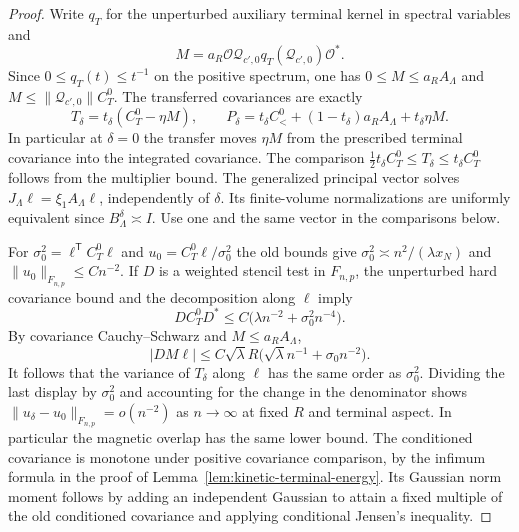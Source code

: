 \documentclass[11pt]{article}
\theoremstyle{definition}
\begin{document}
\begin{proof}
Write \(q_T\) for the unperturbed auxiliary terminal kernel
in spectral variables and
\begin{equation}
 M=a_R\mathcal O\mathcal Q_{c',0} q_T(\mathcal Q_{c',0})
                    \mathcal O^* .
\end{equation}
Since \(0\le q_T(t)\le t^{-1}\) on the positive spectrum, one has
\(0\le M\le a_R A_\Lambda\) and \(M\le \|\mathcal Q_{c',0}\| C_T^0\).
The transferred covariances are exactly
\begin{equation}
 T_\delta=t_\delta(C_T^0-\eta M),\qquad
 P_\delta=t_\delta C_<^0+(1-t_\delta)a_RA_\Lambda
                         +t_\delta\eta M .
 \label{eq:kinetic-transferred-split}
\end{equation}
In particular at \(\delta=0\) the transfer moves \(\eta M\)
from the prescribed terminal covariance into the integrated covariance.
The comparison \(\tfrac12 t_\delta C_T^0\le T_\delta\le t_\delta C_T^0\) follows from the multiplier bound.
The generalized principal vector solves
\(J_\Lambda\ell=\xi_1 A_\Lambda\ell\), independently of
\(\delta\). Its finite-volume normalizations are
uniformly equivalent since \(B_\Lambda^\delta\asymp I\).
Use one and the same vector in the comparisons below.

For \(\sigma_0^2=\ell^{\mathsf T}C_T^0\ell\) and
\(u_0=C_T^0\ell/\sigma_0^2\) the old bounds give
\(\sigma_0^2\asymp n^2/(\lambda x_N)\) and
\(\|u_0\|_{F_{n,p}}\le Cn^{-2}\).
If \(D\) is a weighted stencil test in \(F_{n,p}\), the
unperturbed hard covariance bound and the decomposition
along \(\ell\) imply
\begin{equation}
 D C_T^0D^*\le C\bigl(\lambda n^{-2}+\sigma_0^2n^{-4}\bigr).
\end{equation}
By covariance Cauchy--Schwarz and \(M\le a_R A_\Lambda\),
\begin{equation}
 |DM\ell|\le C\sqrt{\lambda}R
               \bigl(\sqrt\lambda n^{-1}+\sigma_0n^{-2}\bigr).
\end{equation}
It follows that the variance of \(T_\delta\) along \(\ell\) has
the same order as \(\sigma_0^2\). Dividing the last display by
\(\sigma_0^2\) and accounting for the change in the denominator
shows \(\|u_\delta-u_0\|_{F_{n,p}}=o(n^{-2})\) as
\(n\to\infty\) at fixed \(R\) and terminal aspect. In
particular the magnetic overlap has the same lower bound.
The conditioned covariance is monotone under positive
covariance comparison, by the infimum formula in the proof
of Lemma~\ref{lem:kinetic-terminal-energy}. Its Gaussian norm
moment follows by adding an independent Gaussian to attain a
fixed multiple of the old conditioned covariance and applying
conditional Jensen's inequality.


\end{proof}
\end{document}

